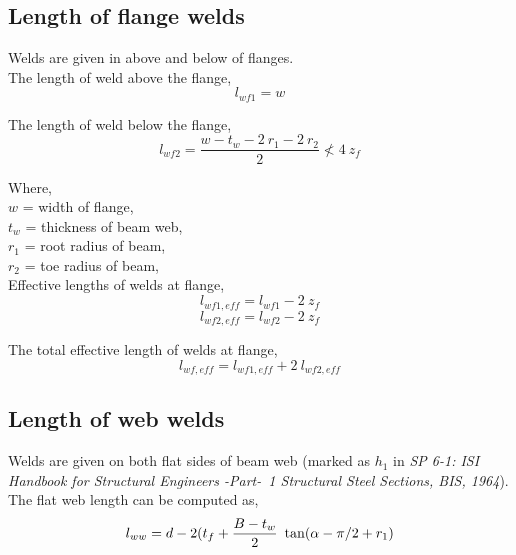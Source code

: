 \documentclass[11.5pt,a4paper,oneside]{report}
\begin{document}
\begin{Form}
\subsection{Length of flange welds}

Welds are given in above and below of flanges. \\
The length of weld above the flange, 
\begin{equation}
	l_{wf1} = w
\end{equation}

The length of weld below the flange, 
\begin{equation}
	l_{wf2} = \frac{w- t_w - 2~r_1 - 2~r_2 }{2} \nless 4~z_f
\end{equation}

Where, \\
\indent $w$ = width of flange, \\
\indent $t_w$ = thickness of beam web, \\
\indent $r_1$ = root radius of beam, \\
\indent $r_2$ = toe radius of beam, \\

Effective lengths of welds at flange, \\
\begin{equation}
	l_{wf1,eff} = l_{wf1} - 2~z_f
\end{equation}
\begin{equation}
	l_{wf2,eff} = l_{wf2} - 2~z_f 
\end{equation}


The total effective length of welds at flange, \\

\begin{equation}
	l_{wf,eff} = l_{wf1,eff} + 2~l_{wf2,eff}
\end{equation}


\subsection{Length of web welds}
Welds are given on both flat sides of beam web (marked as $h_1$ in \textit{SP 6-1: ISI Handbook for Structural Engineers -Part-~1 Structural Steel Sections, BIS, 1964}). \\

The flat web length can be computed as, 
\begin{equation}
	l_{ww} = d- 2(t_f + \frac{B-t_w}{2}~\tan (\alpha-\pi/\small{2} + r_1)
\end{equation}


\end{Form}
\end{document}

